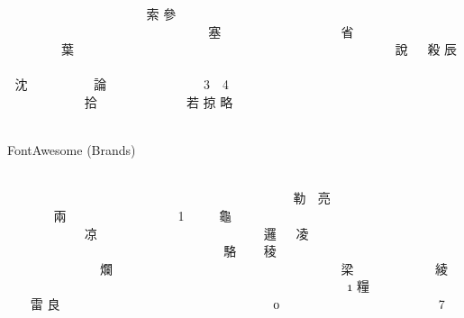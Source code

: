 \documentclass {article}
\begin{document}
{                                                      索  參     
                                                                  
                                                                  
                                          塞                       
                     省                                            
               葉                                                  
                                                                  
   說        殺  辰                                               
                                                                  
                                                               沈  
                     論                                            
                                                                  
                                                   拾              
                  若  掠  略                                      
                                                
}\vspace*{1em}

{FontAwesome (Brands)\fabrands\par
                                                                  
                                                                  
                                                                  
                                                                  
            勒     亮                                            
                     兩                                            
            龜                                                     
                                                               凉  
                                                            邏     
凌                                                                 
                                                                  
      駱           稜                                            
                                                            爛     
                                                                  
            梁                                綾                 
                                                                  
                                                   糧              
                           雷  良                                
                                                                  
                                          
}\vspace*{1em}
\end{document}
